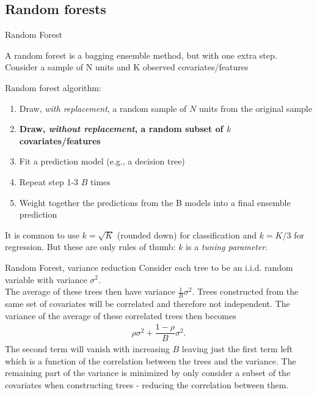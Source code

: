 \documentclass[11pt,aspectratio=1610,usenames,dvipsnames]{beamer} %
\begin{document}

\subsection{Random forests}

\begin{frame}{Random Forest}
	
	A random forest is a bagging ensemble method, but with one extra step. Consider a sample of N units and K observed covariates/features
	
	Random forest algorithm:
	\begin{enumerate}
		\item Draw, \textit{with replacement}, a random sample of $N$ units from the original sample
		\item \textbf{Draw,  \textit{without replacement}, a random subset of $k$ covariates/features}
		\item Fit a prediction model (e.g., a decision tree)
		\item Repeat step 1-3 $B$ times
		\item Weight together the predictions from the B models into a final ensemble prediction
	\end{enumerate}
	
	It is common to use $k=\sqrt{K}$ (rounded down) for classification and $k=K/3$ for regression. But these are only rules of thumb: $k$ is a \textit{tuning parameter}.
\end{frame}

\begin{frame}{Random Forest, variance reduction}
	Consider each tree to be an i.i.d. random variable with variance $\sigma^2$.\\
	The average of these trees then have variance $\frac{1}{B}\sigma^2$. Trees constructed from the same set of covariates will be correlated and therefore not independent. The variance of the average of these correlated trees then becomes
	\begin{align*}
		\rho\sigma^2+\dfrac{1-\rho}{B}\sigma^2.
	\end{align*}
	The second term will vanish with increasing $B$ leaving just the first term left which is a function of the correlation between the trees and the variance. The remaining part of the variance is minimized by only consider a subset of the covariates when constructing trees - reducing the correlation between them.
\end{frame}
\end{document}
